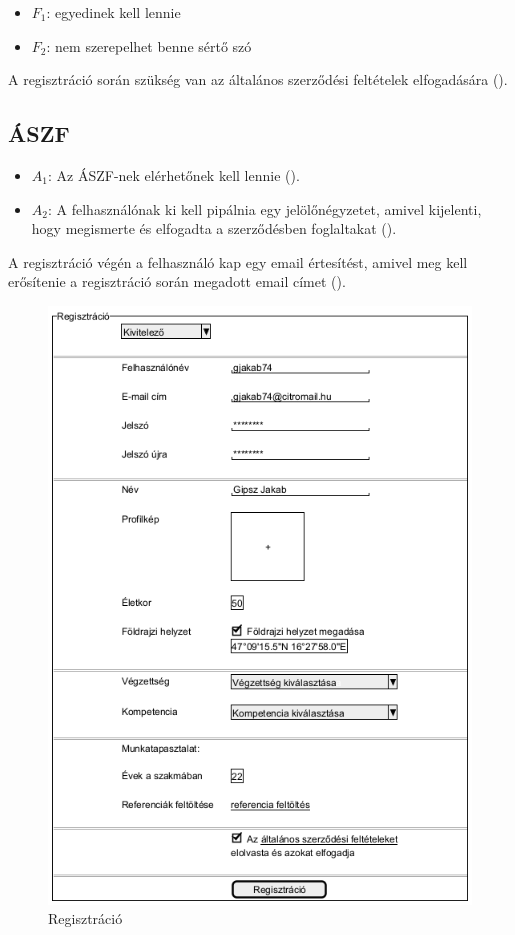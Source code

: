 \begin{itemize}
    \item $F_1$: egyedinek kell lennie
    \item $F_2$: nem szerepelhet benne sértő szó
\end{itemize}

A regisztráció során szükség van az általános szerződési feltételek elfogadására ().

\subsection{ÁSZF}

\begin{itemize}
    \item $A_1$: Az ÁSZF-nek elérhetőnek kell lennie ().
    \item $A_2$: A felhasználónak ki kell pipálnia egy jelölőnégyzetet, amivel kijelenti, hogy megismerte és elfogadta a szerződésben foglaltakat ().
\end{itemize}

A regisztráció végén a felhasználó kap egy email értesítést, amivel meg kell erősítenie a regisztráció során megadott email címet ().

\begin{figure}[h]
	\centering
	\includegraphics[scale=0.5]{img/regisztracio.png}
	\caption*{Regisztráció}
	\label{fig:reg}
\end{figure}